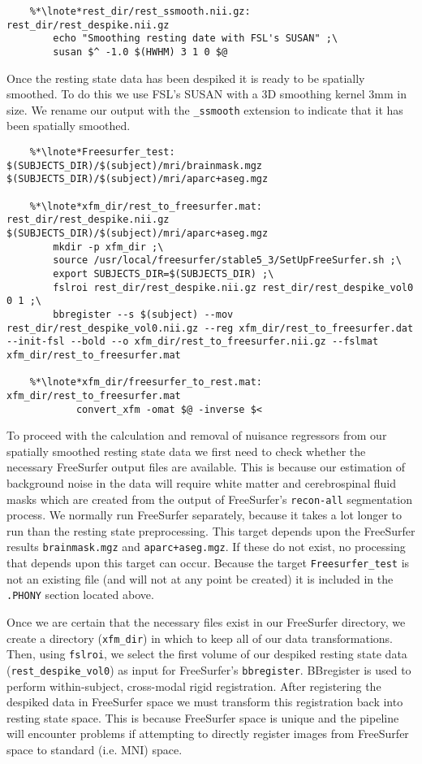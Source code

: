 \begin{lstlisting}
	%*\lnote*rest_dir/rest_ssmooth.nii.gz: rest_dir/rest_despike.nii.gz
		echo "Smoothing resting date with FSL's SUSAN" ;\
		susan $^ -1.0 $(HWHM) 3 1 0 $@
\end{lstlisting}

 Once the resting state data has been despiked it is ready to be spatially smoothed. To do this we use FSL's SUSAN with a 3D smoothing kernel 3mm in size. We rename our output with the  \texttt{_ssmooth} extension to indicate that it has been spatially smoothed.

\begin{lstlisting}
	%*\lnote*Freesurfer_test: $(SUBJECTS_DIR)/$(subject)/mri/brainmask.mgz $(SUBJECTS_DIR)/$(subject)/mri/aparc+aseg.mgz

	%*\lnote*xfm_dir/rest_to_freesurfer.mat: rest_dir/rest_despike.nii.gz $(SUBJECTS_DIR)/$(subject)/mri/aparc+aseg.mgz
		mkdir -p xfm_dir ;\
		source /usr/local/freesurfer/stable5_3/SetUpFreeSurfer.sh ;\
		export SUBJECTS_DIR=$(SUBJECTS_DIR) ;\
		fslroi rest_dir/rest_despike.nii.gz rest_dir/rest_despike_vol0 0 1 ;\
		bbregister --s $(subject) --mov rest_dir/rest_despike_vol0.nii.gz --reg xfm_dir/rest_to_freesurfer.dat --init-fsl --bold --o xfm_dir/rest_to_freesurfer.nii.gz --fslmat xfm_dir/rest_to_freesurfer.mat

	%*\lnote*xfm_dir/freesurfer_to_rest.mat: xfm_dir/rest_to_freesurfer.mat
			convert_xfm -omat $@ -inverse $<
\end{lstlisting}

 To proceed with the calculation and removal of nuisance regressors from our spatially smoothed resting state data we first need to check whether the necessary FreeSurfer output files are available. This is because our estimation of background noise in the data will require white matter and cerebrospinal fluid masks which are created from the output of FreeSurfer's \texttt{recon-all} segmentation process. We normally run FreeSurfer separately, because it takes a lot longer to run than the resting state preprocessing. This target depends upon the FreeSurfer results \texttt{brainmask.mgz} and \texttt{aparc+aseg.mgz}. If these do not exist, no processing that depends upon this target can occur. Because the target \texttt{Freesurfer_test} is not an existing file (and will not at any point be created) it is included in the \texttt{.PHONY} section located above.

\lnum{12} Once we are certain that the necessary files exist in our FreeSurfer directory, we create a directory (\texttt{xfm_dir}) in which to keep all of our data transformations. Then, using \texttt{fslroi}, we select the first volume of our despiked resting state data (\texttt{rest_despike_vol0}) as input for FreeSurfer's \texttt{bbregister}. BBregister is used to perform within-subject, cross-modal rigid registration.  After registering the despiked data in FreeSurfer space we must transform this registration back into resting state space. This is because FreeSurfer space is unique and the pipeline will encounter problems if attempting to directly register images from FreeSurfer space to standard (i.e. MNI) space.

